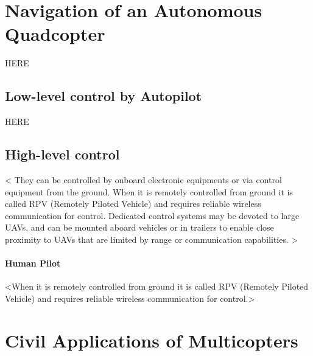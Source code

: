 
\section{Navigation of an Autonomous Quadcopter}

HERE

\subsection{Low-level control by Autopilot}

HERE

\subsection{High-level control}

<
They can be controlled by onboard electronic equipments 
or via control equipment from the ground. 
When it is remotely controlled from ground 
it is called RPV (Remotely Piloted Vehicle) 
and requires reliable wireless communication for control. 
Dedicated control systems may be devoted to large UAVs, 
and can be mounted aboard vehicles or in trailers 
to enable close proximity to UAVs that are 
limited by range or communication capabilities.
>


\paragraph{Human Pilot}
<When it is remotely controlled from ground 
it is called RPV (Remotely Piloted Vehicle) 
and requires reliable wireless communication for control.>







\section{Civil Applications of Multicopters}

